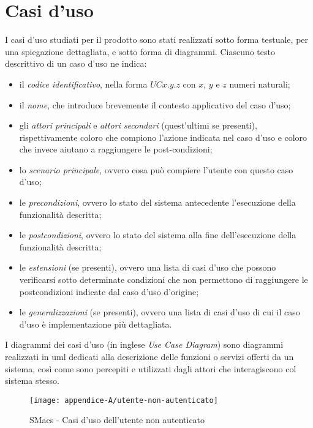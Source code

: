 \section{Casi d'uso}
\label{sec:casi-uso}

I casi d'uso studiati per il prodotto sono stati realizzati sotto forma testuale, per una spiegazione dettagliata, e sotto forma di diagrammi.
Ciascuno testo descrittivo di un caso d'uso ne indica:
\begin{itemize}
    \item il \emph{codice identificativo}, nella forma $UCx.y.z$ con $x$, $y$ e $z$ numeri naturali;
    \item il \emph{nome}, che introduce brevemente il contesto applicativo del caso d'uso;
    \item gli \emph{attori principali} e \emph{attori secondari} (quest'ultimi se presenti), rispettivamente coloro che compiono l'azione indicata nel caso d'uso e coloro che invece aiutano a raggiungere le post-condizioni;
    \item lo \emph{scenario principale}, ovvero cosa può compiere l'utente con questo caso d'uso;
    \item le \emph{precondizioni}, ovvero lo stato del sistema antecedente l'esecuzione della funzionalità descritta;
    \item le \emph{postcondizioni}, ovvero lo stato del sistema alla fine dell'esecuzione della funzionalità descritta;
    \item le \emph{estensioni} (se presenti), ovvero una lista di casi d'uso che possono verificarsi sotto determinate condizioni che non permettono di raggiungere le postcondizioni indicate dal caso d'uso d'origine;
    \item le \emph{generalizzazioni} (se presenti), ovvero una lista di casi d'uso di cui il caso d'uso è implementazione più dettagliata.
\end{itemize}
I diagrammi dei casi d'uso (in inglese \emph{Use Case Diagram}) sono diagrammi realizzati in \gls{uml} dedicati alla descrizione delle funzioni o servizi offerti da un sistema, così come sono percepiti e utilizzati dagli attori che interagiscono col sistema stesso.

\begin{figure}[!h] 
    \centering 
    \texttt{[image: appendice-A/utente-non-autenticato]} 
    \caption{SMacs - Casi d'uso dell'utente non autenticato}
\end{figure}

